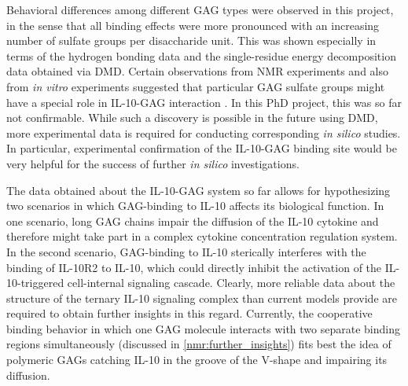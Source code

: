 
Behavioral differences among different GAG types were observed in this project,
in the sense that all binding effects were more pronounced with an increasing
number of sulfate groups per disaccharide unit. This was shown especially in
terms of the hydrogen bonding data and the single-residue energy decomposition
data obtained via DMD. Certain observations from NMR experiments and also from
\textit{in vitro} experiments suggested that particular GAG sulfate groups might
have a special role in IL-10-GAG interaction \cite{salek_ardakani_2000,
kuenze_gehrcke_2014}. In this PhD project, this was so far not confirmable.
While such a discovery is possible in the future using DMD, more experimental
data is required for conducting corresponding \textit{in silico} studies. In
particular, experimental confirmation of the IL-10-GAG binding site would be
very helpful for the success of further \textit{in silico} investigations.

The data obtained about the IL-10-GAG system so far allows for hypothesizing two
scenarios in which GAG-binding to IL-10 affects its biological function. In one
scenario, long GAG chains impair the diffusion of the IL-10 cytokine and
therefore might take part in a complex cytokine concentration regulation system.
In the second scenario, GAG-binding to IL-10 sterically interferes with the
binding of IL-10R2 to IL-10, which could directly inhibit the activation of the
IL-10-triggered cell-internal signaling cascade. Clearly, more reliable data
about the structure of the ternary IL-10 signaling complex than current models
provide are required to obtain further insights in this regard. Currently, the
cooperative binding behavior in which one GAG molecule interacts with two
separate binding regions simultaneously (discussed in
\cref{nmr:further_insights}) fits best the idea of polymeric GAGs catching IL-10
in the groove of the V-shape and impairing its diffusion.

